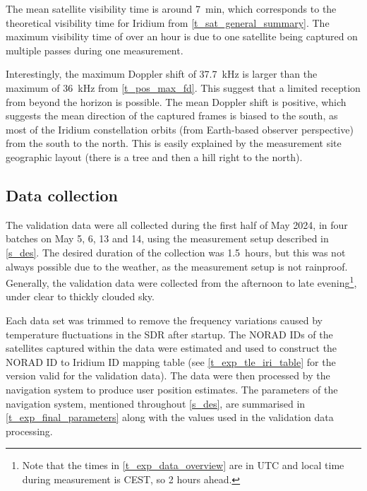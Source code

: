The mean satellite visibility time is around \qty{7}{min}, which corresponds to the theoretical visibility time for Iridium from \autoref{t_sat_general_summary}. The maximum visibility time of over an hour is due to one satellite being captured on multiple passes during one measurement.

Interestingly, the maximum Doppler shift of \qty{37.7}{kHz} is larger than the maximum of \qty{36}{kHz} from \autoref{t_pos_max_fd}. This suggest that a limited reception from beyond the horizon is possible. The mean Doppler shift is positive, which suggests the mean direction of the captured frames is biased to the south, as most of the Iridium constellation orbits (from Earth-based observer perspective) from the south to the north. This is easily explained by the measurement site geographic layout (there is a tree and then a hill right to the north).


\subsection{Data collection}
The validation data were all collected during the first half of May 2024, in four batches on May 5, 6, 13 and 14, using the measurement setup described in \autoref{s_des}. The desired duration of the collection was \qty{1.5}{hours}, but this was not always possible due to the weather, as the measurement setup is not rainproof. Generally, the validation data were collected from the afternoon to late evening\footnote{Note that the times in \autoref{t_exp_data_overview} are in UTC and local time during measurement is CEST, so 2 hours ahead.}, under clear to thickly clouded sky.

Each data set was trimmed to remove the frequency variations caused by temperature fluctuations in the SDR after startup. The NORAD IDs of the satellites captured within the data were estimated and used to construct the NORAD ID to Iridium ID mapping table (see \autoref{t_exp_tle_iri_table} for the version valid for the validation data). The data were then processed by the navigation system to produce user position estimates. The parameters of the navigation system, mentioned throughout \autoref{s_des}, are summarised in \autoref{t_exp_final_parameters} along with the values used in the validation data processing.



